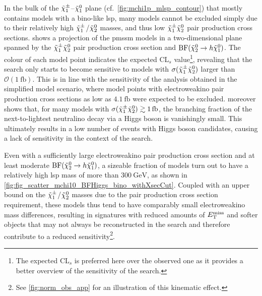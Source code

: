 In the bulk of the $\tilde{\chi}_1^\pm$--$\tilde{\chi}_1^0$ plane (cf.~\cref{fig:mchi1p_mlsp_contour}) that mostly contains models with a bino-like \gls{lsp}, many models cannot be excluded simply due to their relatively high $\tilde{\chi}_1^\pm$/$\tilde{\chi}_2^0$ masses, and thus low $\tilde{\chi}_1^\pm\tilde{\chi}_2^0$ pair production cross sections.
 shows a projection of the \gls{pmssm} models in a two-dimensional plane spanned by the $\tilde{\chi}_1^\pm\tilde{\chi}_2^0$ pair production cross section and $\mathrm{BF}(\tilde{\chi}_2^0 \rightarrow h \tilde{\chi}_1^0)$.
The colour of each model point indicates the expected CL$_s$ value\footnote{The expected CL$_s$ is preferred here over the observed one as it provides a better overview of the sensitivity of the \onelepton search.}, revealing that the \onelepton search only starts to become sensitive to models with $\sigma(\tilde{\chi}_1^\pm\tilde{\chi}_2^0)$ larger than $\mathcal{O}(\SI{1}{\femto\barn})$.
This is in line with the sensitivity of the \onelepton analysis obtained in the simplified model scenario, where model points with electroweakino pair production cross sections as low as $\SI{4.1}{\femto\barn}$ were expected to be excluded.
 moreover shows that, for many models with $\sigma(\charg\neutr) \gtrsim\SI{1}{\femto\barn}$, the branching fraction of the next-to-lightest neutralino decay via a Higgs boson is vanishingly small. This ultimately results in a low number of events with Higgs boson candidates, causing a lack of sensitivity in the context of the \onelepton search.

Even with a sufficiently large electroweakino pair production cross section and at least moderate $\mathrm{BF}(\tilde{\chi}_2^0 \rightarrow h \tilde{\chi}_1^0)$, a sizeable fraction of models turn out to have a relatively high \gls{lsp} mass of more than $\SI{300}{\GeV}$, as shown in \cref{fig:fig_scatter_mchi10_BFHiggs_bino_withXsecCut}. Coupled with an upper bound on the \mbox{$\tilde{\chi}_1^\pm$/$\tilde{\chi}_2^0$} masses due to the pair production cross section requirement, these models thus tend to have comparably small electroweakino mass differences, resulting in signatures with reduced amounts of $E_{\textrm{T}}^{\textrm{miss}}$ and softer objects that may not always be reconstructed in the \onelepton search and therefore contribute to a reduced sensitivity\footnote{See \cref{fig:norm_obs_app} for an illustration of this kinematic effect.}.

